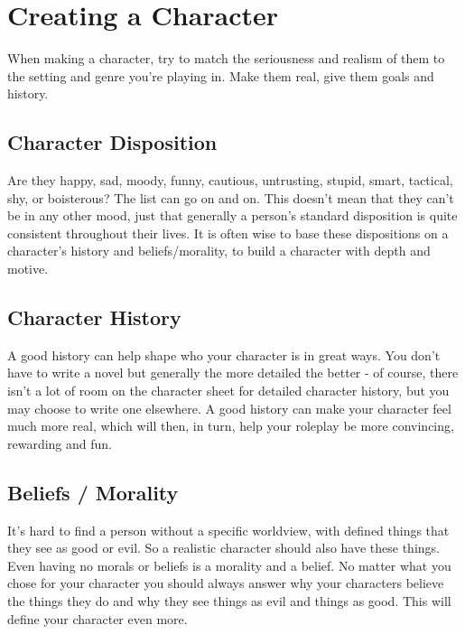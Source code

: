 \section{Creating a Character} \label{sec:creating_a_character}

When making a character, try to match the seriousness and realism of them to the setting and genre you're playing in. Make them real, give them goals and history. %


\subsection{Character Disposition} \label{subsec:character_disposition}

Are they happy, sad, moody, funny, cautious, untrusting, stupid, smart, tactical, shy, or boisterous? The list can go on and on. This doesn't mean that they can't be in any other mood, just that generally a person's standard disposition is quite consistent throughout their lives. It is often wise to base these dispositions on a character's history and beliefs/morality, to build a character with depth and motive.

\subsection{Character History} \label{subsec:character_history}

A good history can help shape who your character is in great ways. You don't have to write a novel but generally the more detailed the better - of course, there isn't a lot of room on the character sheet for detailed character history, but you may choose to write one elsewhere. A good history can make your character feel much more real, which will then, in turn, help your roleplay be more convincing, rewarding and fun.

\subsection{Beliefs / Morality} \label{subsec:beliefs_morality}

It's hard to find a person without a specific worldview, with defined things that they see as good or evil. So a realistic character should also have these things. Even having no morals or beliefs is a morality and a belief. No matter what you chose for your character you should always answer why your characters believe the things they do and why they see things as evil and things as good. This will define your character even more.

